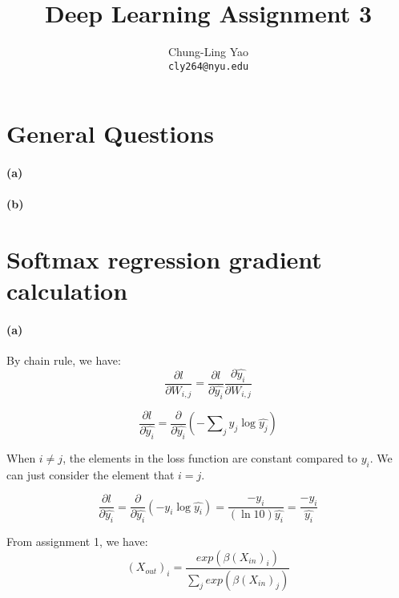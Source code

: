 \documentclass{article}
\title{Deep Learning Assignment 3}
\author{
  Chung-Ling Yao \\
  \texttt{cly264@nyu.edu} \\
}
\begin{document}

\maketitle

\section{General Questions}

\paragraph{(a)}

\paragraph{(b)}


\section{Softmax regression gradient calculation}
\paragraph{(a)}

By chain rule, we have:
\begin{equation}
\frac{\partial l}{\partial W_{i,j}} = \frac{\partial l}{\partial \hat{y_i}} \frac{\partial \hat{y_i}}{\partial W_{i,j}}
\end{equation}

\begin{equation}
\frac{\partial l}{\partial \hat{y_i}} 
= \frac{\partial }{\partial \hat{y_i}} (-\sum\nolimits_j {y_j \log \hat{y_j}})
\end{equation}

When $i \neq j$, the elements in the loss function are constant compared to $y_i$.
We can just consider the element that $i=j$.

\begin{equation}
\frac{\partial l}{\partial \hat{y_i}} 
= \frac{\partial }{\partial \hat{y_i}} (- {y_i \log \hat{y_i}})
= \frac{-y_i}{(\ln 10) \hat{y_i}}
= \frac{-y_i}{\hat{y_i}}
\end{equation}

From assignment 1, we have:
\begin{equation}
(X_{out})_i = \frac{exp(\beta (X_{in})_i)}{\sum\nolimits_j exp(\beta (X_{in})_j)}
\end{equation}
\end{document}
